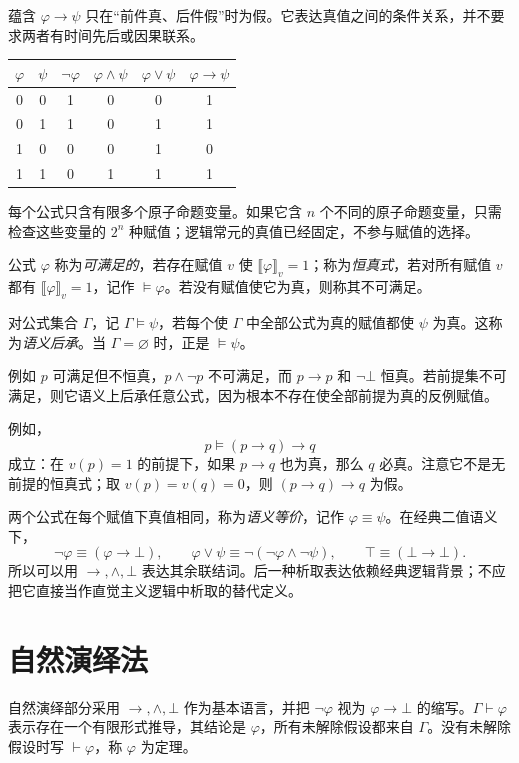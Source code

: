\documentclass[lang=cn,a4paper,fontset=none,zihao=false,10pt,openany,twoside]{beautybook}
\numberwithin{algorithm}{chapter}
\newcommand{\val}[1]{\llbracket #1\rrbracket_v}
\begin{document}
蕴含 $\varphi\to\psi$ 只在“前件真、后件假”时为假。它表达真值之间的条件关系，并不要求两者有时间先后或因果联系。
\begin{center}
\begin{tabular}{cc|cccc}
\toprule
$\varphi$&$\psi$&$\neg\varphi$&$\varphi\wedge\psi$&$\varphi\vee\psi$&$\varphi\to\psi$\\
\midrule
0&0&1&0&0&1\\0&1&1&0&1&1\\1&0&0&0&1&0\\1&1&0&1&1&1\\
\bottomrule
\end{tabular}
\end{center}
每个公式只含有限多个原子命题变量。如果它含 $n$ 个不同的原子命题变量，只需检查这些变量的 $2^n$ 种赋值；逻辑常元的真值已经固定，不参与赋值的选择。

\begin{definition}
公式 $\varphi$ 称为\emph{可满足的}，若存在赋值 $v$ 使 $\val\varphi=1$；称为\emph{恒真式}，若对所有赋值 $v$ 都有 $\val\varphi=1$，记作 $\models\varphi$。若没有赋值使它为真，则称其不可满足。

对公式集合 $\Gamma$，记 $\Gamma\models\psi$，若每个使 $\Gamma$ 中全部公式为真的赋值都使 $\psi$ 为真。这称为\emph{语义后承}。当 $\Gamma=\varnothing$ 时，正是 $\models\psi$。
\end{definition}
例如 $p$ 可满足但不恒真，$p\wedge\neg p$ 不可满足，而 $p\to p$ 和 $\neg\bot$ 恒真。若前提集不可满足，则它语义上后承任意公式，因为根本不存在使全部前提为真的反例赋值。

例如，
\[
 p\models (p\to q)\to q
\]
成立：在 $v(p)=1$ 的前提下，如果 $p\to q$ 也为真，那么 $q$ 必真。注意它不是无前提的恒真式；取 $v(p)=v(q)=0$，则 $(p\to q)\to q$ 为假。

两个公式在每个赋值下真值相同，称为\emph{语义等价}，记作 $\varphi\equiv\psi$。在经典二值语义下，
\[
 \neg\varphi\equiv(\varphi\to\bot),\qquad
 \varphi\vee\psi\equiv\neg(\neg\varphi\wedge\neg\psi),\qquad
 \top\equiv(\bot\to\bot).
\]
所以可以用 $\to,\wedge,\bot$ 表达其余联结词。后一种析取表达依赖经典逻辑背景；不应把它直接当作直觉主义逻辑中析取的替代定义。


\section{自然演绎法}\label{sec:natural-deduction}
自然演绎部分采用 $\to,\wedge,\bot$ 作为基本语言，并把 $\neg\varphi$ 视为 $\varphi\to\bot$ 的缩写。$\Gamma\vdash\varphi$ 表示存在一个有限形式推导，其结论是 $\varphi$，所有未解除假设都来自 $\Gamma$。没有未解除假设时写 $\vdash\varphi$，称 $\varphi$ 为定理。
\end{document}
